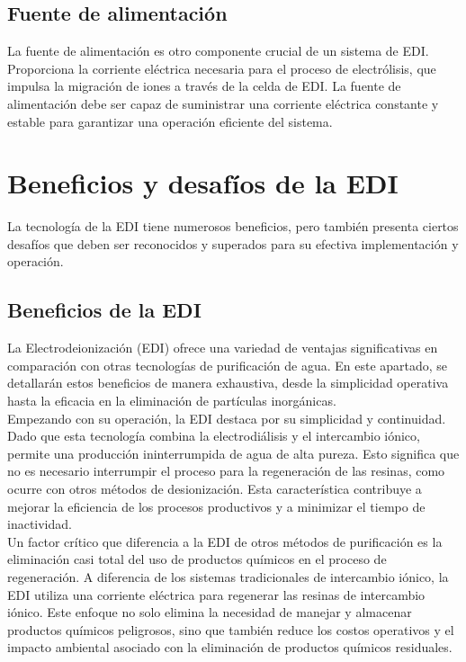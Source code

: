 \subsection{Fuente de alimentación}
La fuente de alimentación es otro componente crucial de un sistema de EDI. Proporciona la corriente eléctrica necesaria para el proceso de electrólisis, que impulsa la migración de iones a través de la celda de EDI. La fuente de alimentación debe ser capaz de suministrar una corriente eléctrica constante y estable para garantizar una operación eficiente del sistema. \\


\section{Beneficios y desafíos de la EDI}
La tecnología de la EDI tiene numerosos beneficios, pero también presenta ciertos desafíos que deben ser reconocidos y superados para su efectiva implementación y operación. \\

\subsection{Beneficios de la EDI}
La Electrodeionización (EDI) ofrece una variedad de ventajas significativas en comparación con otras tecnologías de purificación de agua. En este apartado, se detallarán estos beneficios de manera exhaustiva, desde la simplicidad operativa hasta la eficacia en la eliminación de partículas inorgánicas.\\

Empezando con su operación, la EDI destaca por su simplicidad y continuidad. Dado que esta tecnología combina la electrodiálisis y el intercambio iónico, permite una producción ininterrumpida de agua de alta pureza. Esto significa que no es necesario interrumpir el proceso para la regeneración de las resinas, como ocurre con otros métodos de desionización. Esta característica contribuye a mejorar la eficiencia de los procesos productivos y a minimizar el tiempo de inactividad.\\

Un factor crítico que diferencia a la EDI de otros métodos de purificación es la eliminación casi total del uso de productos químicos en el proceso de regeneración. A diferencia de los sistemas tradicionales de intercambio iónico, la EDI utiliza una corriente eléctrica para regenerar las resinas de intercambio iónico. Este enfoque no solo elimina la necesidad de manejar y almacenar productos químicos peligrosos, sino que también reduce los costos operativos y el impacto ambiental asociado con la eliminación de productos químicos residuales.\\

